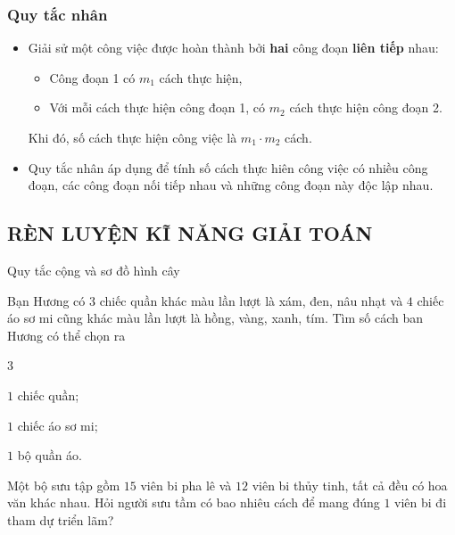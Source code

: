 \subsubsection{Quy tắc nhân}
\begin{itemize}
	\item [\iconMT]  
	\begin{tcolorbox}[colframe=orange,colback=orange!3,boxrule=0.2mm]
		Giải sử một công việc được hoàn thành bởi \textbf{hai} công đoạn \textbf{liên tiếp} nhau:
		\begin{itemize}
			\item [$\bullet$] Công đoạn 1 có $m_1$ cách thực hiện, 
			\item [$\bullet$] Với mỗi cách thực hiện công đoạn 1, có  $m_2$ cách thực hiện công đoạn 2.
		\end{itemize}
		Khi đó, số cách thực hiện công việc là $m_1 \cdot m_2$ cách.
	\end{tcolorbox}
	\item [\iconMT]  Quy tắc nhân áp dụng để tính số cách thực hiên công việc có nhiều công đoạn, các công đoạn nối tiếp nhau và những công đoạn này độc lập nhau.
\end{itemize}

\subsection{RÈN LUYỆN KĨ NĂNG GIẢI TOÁN}
\begin{dang}{Quy tắc cộng và sơ đồ hình cây}
\end{dang}

\begin{vd}%
	Bạn Hương có $ 3 $ chiếc quần khác màu lần lượt là xám, đen, nâu nhạt và $ 4 $ chiếc áo sơ mi cũng khác màu lần lượt là hồng, vàng, xanh, tím. Tìm số cách ban Hương có thể chọn ra
	\begin{enumEX}{3}
		\item $ 1 $ chiếc quần;
		\item $ 1 $ chiếc áo sơ mi;
		\item $ 1 $ bộ quần áo.
	\end{enumEX}
	\loigiai{
	}
\end{vd} 

\begin{vd}
	Một bộ sưu tập gồm $15$ viên bi pha lê và $12$ viên bi thủy tinh, tất cả đều có hoa văn khác nhau. Hỏi người sưu tầm có bao nhiêu cách để mang đúng $1$ viên bi đi tham dự triển lãm?
\end{vd}

